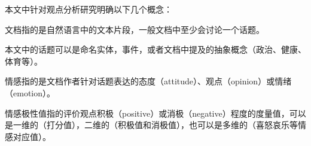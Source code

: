 本文中针对观点分析研究明确以下几个概念：
\begin{definition}[文档Document]
文档指的是自然语言中的文本片段，一般文档中至少会讨论一个话题。
\end{definition}

\begin{definition}[话题Topic]
本文中的话题可以是命名实体，事件，或者文档中提及的抽象概念（政治、健康、体育等）。
\end{definition}

\begin{definition}[情感Sentiment]
情感指的是文档作者针对话题表达的态度（attitude）、观点（opinion）或情绪（emotion）。
\end{definition}

\begin{definition}
情感极性值指的评价观点积极（positive）或消极（negative）程度的度量值，可以是一维的（打分值），二维的（积极值和消极值），也可以是多维的（喜怒哀乐等情感对应值）。
\end{definition}

